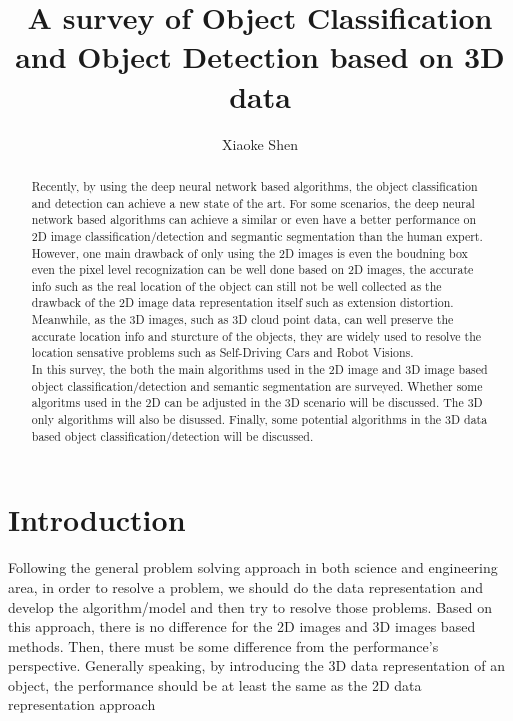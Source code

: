 \documentclass[a4paper,12pt]{article}
\title {A survey of Object Classification and Object Detection based on 3D data }
\author{Xiaoke Shen}
\affil{The Graduate Center, City University of New York}
\date{}
\begin{document}
\maketitle
\begin{abstract}
Recently, by using the deep neural network based algorithms, the object classification and detection can achieve a new state of the art. For some scenarios, the deep neural network based algorithms can achieve a similar or even have a better performance on 2D image classification/detection and segmantic segmentation than the human expert. However, one main drawback of only using the 2D images is even the boudning box even the pixel level recognization can be well done based on 2D images, the accurate info such as the real location of the object can still not be well collected as the drawback of the 2D image data representation itself such as extension distortion. Meanwhile, as the 3D images, such as 3D cloud point data, can well preserve the accurate location info and sturcture of the objects, they are widely used to resolve the location sensative problems such as Self-Driving Cars and Robot Visions.\\
In this survey, the both the main algorithms used in the 2D image and 3D image based object classification/detection and semantic segmentation are surveyed. Whether some algoritms used in the 2D can be adjusted in the 3D scenario will be discussed. The 3D only algorithms will also be disussed. Finally, some potential algorithms in the 3D data based object classification/detection will be discussed.\\
\end{abstract}
\section{Introduction}

Following the general problem solving approach in both science and engineering area, in order to resolve a problem, we should do the data representation and develop the algorithm/model and then try to resolve those problems. Based on this approach, there is no difference for the 2D images and 3D images based methods. Then, there must be some difference from the performance's perspective. Generally speaking, by introducing the 3D data representation of an object, the performance should be at least the same as the 2D data representation approach 
\end{document}
